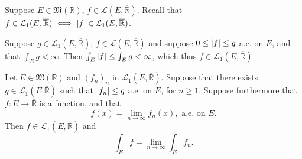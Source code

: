 \documentclass[notoc,notitlepage]{tufte-book}
\begin{document}
\begin{eg}
  Suppose $E \in \mathfrak{M}(\mathbb{R})$, $f \in \mathcal{L}(E,
  \overline{\mathbb{R}})$. Recall that $f \in \mathcal{L}_1(E,
  \overline{\mathbb{R}}) \iff \left|f\right| \in \mathcal{L}_1(E,
  \overline{\mathbb{R}})$.

  Suppose $g \in \mathcal{L}_1(E, \overline{\mathbb{R}})$, $f \in
  \mathcal{L}(E, \overline{\mathbb{R}})$ and suppose $0 \leq \left|f\right| \leq g$ 
  a.e. on $E$, and that $\int_{E} g < \infty$. Then $\int_{E} \left|f\right| \leq
  \int_{E} g < \infty$, which thus $f \in \mathcal{L}_1(E,
  \overline{\mathbb{R}})$.
\end{eg}

\begin{thm}\label{thm:lebesgue_dominated_convergence_theorem}
  Let $E \in \mathfrak{M}(\mathbb{R})$ and $(f_n)_n$ in $\mathcal{L}_1(E,
  \overline{\mathbb{R}})$. Suppose that there exists $g \in \mathcal{L}_1(E.
  \overline{\mathbb{R}})$ such that $\left|f_n\right| \leq g$ a.e. on $E$, for $n \geq
  1$. Suppose furthermore that $f : E \to \overline{\mathbb{R}}$ is a function,
  and that
  \begin{equation*}
    f(x) = \lim_{n \to \infty} f_n(x), \text{ a.e. on } E.
  \end{equation*}
  Then $f \in \mathcal{L}_1(E, \overline{\mathbb{R}})$ and
  \begin{equation*}
    \int_{E} f = \lim_{n \to \infty} \int_{E} f_n.
  \end{equation*}
\end{thm}
\end{document}
